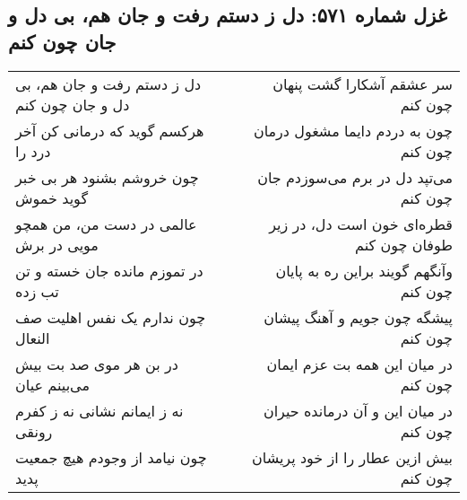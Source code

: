 \begin{center}
\section*{غزل شماره ۵۷۱: دل ز دستم رفت و جان هم، بی دل و جان چون کنم}
\label{sec:571}
\begin{longtable}{l p{0.5cm} r}
دل ز دستم رفت و جان هم، بی دل و جان چون کنم
&&
سر عشقم آشکارا گشت پنهان چون کنم
\\
هرکسم گوید که درمانی کن آخر درد را
&&
چون به دردم دایما مشغول درمان چون کنم
\\
چون خروشم بشنود هر بی خبر گوید خموش
&&
می‌تپد دل در برم می‌سوزدم جان چون کنم
\\
عالمی در دست من، من همچو مویی در برش
&&
قطره‌ای خون است دل، در زیر طوفان چون کنم
\\
در تموزم مانده جان خسته و تن تب زده
&&
وآنگهم گویند براین ره به پایان چون کنم
\\
چون ندارم یک نفس اهلیت صف النعال
&&
پیشگه چون جویم و آهنگ پیشان چون کنم
\\
در بن هر موی صد بت بیش می‌بینم عیان
&&
در میان این همه بت عزم ایمان چون کنم
\\
نه ز ایمانم نشانی نه ز کفرم رونقی
&&
در میان این و آن درمانده حیران چون کنم
\\
چون نیامد از وجودم هیچ جمعیت پدید
&&
بیش ازین عطار را از خود پریشان چون کنم
\\
\end{longtable}
\end{center}
